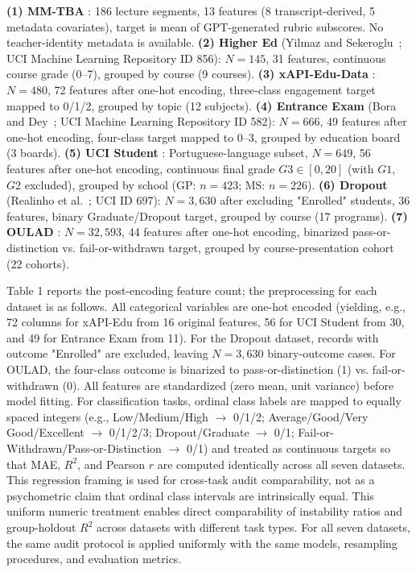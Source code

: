 \documentclass[10pt,letterpaper]{article}
\begin{document}
\textbf{(1) MM-TBA} \citep{Huang2025}: 186 lecture segments, 13 features (8 transcript-derived, 5 metadata covariates), target is mean of GPT-generated rubric subscores. No teacher-identity metadata is available. \textbf{(2) Higher Ed} (Yilmaz and Sekeroglu~\citep{Yilmaz2020}; UCI Machine Learning Repository ID 856): $N=145$, 31 features, continuous course grade (0--7), grouped by course (9 courses). \textbf{(3) xAPI-Edu-Data} \citep{Amrieh2016}: $N=480$, 72 features after one-hot encoding, three-class engagement target mapped to 0/1/2, grouped by topic (12 subjects). \textbf{(4) Entrance Exam} (Bora and Dey~\citep{Bora2021}; UCI Machine Learning Repository ID 582): $N=666$, 49 features after one-hot encoding, four-class target mapped to 0--3, grouped by education board (3 boards). \textbf{(5) UCI Student} \citep{Cortez2008}: Portuguese-language subset, $N=649$, 56 features after one-hot encoding, continuous final grade $G3 \in [0, 20]$ (with $G1$, $G2$ excluded), grouped by school (GP: $n=423$; MS: $n=226$). \textbf{(6) Dropout} (Realinho et al.~\citep{Realinho2022}; UCI ID 697): $N=3{,}630$ after excluding "Enrolled" students, 36 features, binary Graduate/Dropout target, grouped by course (17 programs). \textbf{(7) OULAD} \citep{Kuzilek2017}: $N=32{,}593$, 44 features after one-hot encoding, binarized pass-or-distinction vs. fail-or-withdrawn target, grouped by course-presentation cohort (22 cohorts).

Table 1 reports the post-encoding feature count; the preprocessing for each dataset is as follows. All categorical variables are one-hot encoded (yielding, e.g., 72 columns for xAPI-Edu from 16 original features, 56 for UCI Student from 30, and 49 for Entrance Exam from 11). For the Dropout dataset, records with outcome "Enrolled" are excluded, leaving $N = 3{,}630$ binary-outcome cases. For OULAD, the four-class outcome is binarized to pass-or-distinction (1) vs. fail-or-withdrawn (0). All features are standardized (zero mean, unit variance) before model fitting. For classification tasks, ordinal class labels are mapped to equally spaced integers (e.g., Low/Medium/High $\to$ 0/1/2; Average/Good/Very Good/Excellent $\to$ 0/1/2/3; Dropout/Graduate $\to$ 0/1; Fail-or-Withdrawn/Pass-or-Distinction $\to$ 0/1) and treated as continuous targets so that MAE, $R^2$, and Pearson $r$ are computed identically across all seven datasets. This regression framing is used for cross-task audit comparability, not as a psychometric claim that ordinal class intervals are intrinsically equal. This uniform numeric treatment enables direct comparability of instability ratios and group-holdout $R^2$ across datasets with different task types. For all seven datasets, the same audit protocol is applied uniformly with the same models, resampling procedures, and evaluation metrics.
\end{document}
